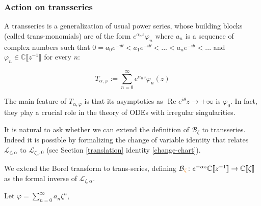 \documentclass{article}
\theoremstyle{definition}
\newcommand{\maps}{\colon}
\newcommand{\C}{\mathbb{C}}
\newcommand{\laplace}{\mathcal{L}}
\newcommand{\borel}{\mathcal{B}}
\begin{document}
\subsubsection{Action on transseries}\label{sec:action_transseries}

A transseries is a generalization of usual power series, whose building blocks (called trans-monomials) are of the form $e^{\alpha_n z}\varphi_n$ where $a_n$ is a sequence of complex numbers such that $0=a_0 e^{-i\theta}< a_1 e^{-i\theta}<...<a_n e^{-i\theta}<...$ and $\varphi_n\in\C\llbracket z^{-1}\rrbracket$ for every $n$: 

\[T_{\alpha,\varphi}:=\sum_{n=0}^{\infty} e^{\alpha_n z} \varphi_n(z) \]

The main feature of $T_{\alpha,\varphi}$ is that its asymptotics as $\text{ Re } e^{i\theta}z \to +\infty$ is $\varphi_0$. In fact, they play a crucial role in the theory of ODEs with irregular singularities. 

It is natural to ask whether we can extend the definition of $\borel_\zeta$ to transseries. Indeed it is possible by formalizing the change of variable identity that relates $\laplace_{\zeta, \alpha}$ to $\laplace_{\zeta_\alpha, 0}$ (see Section \ref{translation} identity \eqref{change-chart}). 

We extend the Borel transform to trans-series, defining $\borel\textcolor{orange}{_\zeta} \maps e^{-\alpha z} \C\llbracket z^{-1} \rrbracket \to \C\llbracket \zeta \rrbracket$ as the formal inverse of $\laplace_{\zeta, \alpha}$.

Let $\varphi=\sum_{n=0}^{\infty}a_n\zeta^n$, %
\end{document}
